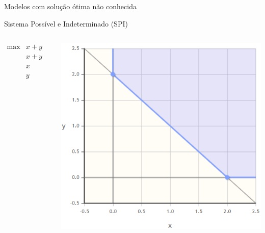 \documentclass[compress,mathserif]{beamer}
\begin{document}

\begin{frame}{Modelos com solução ótima não conhecida}

Sistema Possível e Indeterminado (SPI)

\vspace{1cm}

\begin{columns}[T]
    \begin{column}{.49\textwidth}
    \vspace{1cm}
    $$\begin{matrix}
        \max & x + y \\ 
             & x + y & \geq 2 \\
             & x & \geq 0 \\
             & y & \geq 0 
        \end{matrix}    
$$
    \end{column}
    \begin{column}{.49\textwidth}
        \centering\includegraphics[width=\linewidth]{images/nao_conhecida.png}
    \end{column}
\end{columns}

\end{frame}

\end{document}
